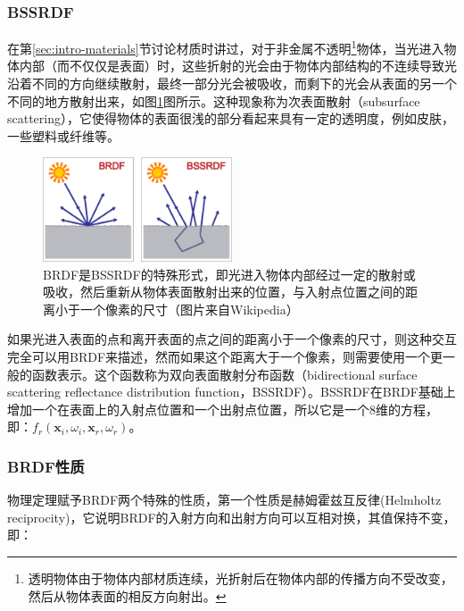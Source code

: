 \subsubsection{BSSRDF}
在第\ref{sec:intro-materials}节讨论材质时讲过，对于非金属不透明\footnote{透明物体由于物体内部材质连续，光折射后在物体内部的传播方向不受改变，然后从物体表面的相反方向射出。}物体，当光进入物体内部（而不仅仅是表面）时，这些折射的光会由于物体内部结构的不连续导致光沿着不同的方向继续散射，最终一部分光会被吸收，而剩下的光会从表面的另一个不同的地方散射出来，如图\ref{f:intro-bssrdf-1}图所示。这种现象称为次表面散射（subsurface scattering），它使得物体的表面很浅的部分看起来具有一定的透明度，例如皮肤，一些塑料或纤维等。

\begin{figure}
	\sidecaption
	\includegraphics[width=0.5\textwidth]{figures/intro/BSSDF}
	\caption{BRDF是BSSRDF的特殊形式，即光进入物体内部经过一定的散射或吸收，然后重新从物体表面散射出来的位置，与入射点位置之间的距离小于一个像素的尺寸（图片来自Wikipedia）}
	\label{f:intro-bssrdf-1}
\end{figure}

如果光进入表面的点和离开表面的点之间的距离小于一个像素的尺寸，则这种交互完全可以用BRDF来描述，然而如果这个距离大于一个像素，则需要使用一个更一般的函数表示。这个函数称为双向表面散射分布函数（bidirectional surface scattering reflectance distribution function，BSSRDF）\cite{a:GeometricConsiderationsandNomenclatureforReflectance}。BSSRDF在BRDF基础上增加一个在表面上的入射点位置和一个出射点位置，所以它是一个8维的方程，即：$f_r(\mathbf{x}_i,\omega_i,\mathbf{x}_r,\omega_r)$。




\subsubsection{BRDF性质}
物理定理赋予BRDF两个特殊的性质，第一个性质是赫姆霍兹互反律(Helmholtz reciprocity)，它说明BRDF的入射方向和出射方向可以互相对换，其值保持不变，即：

